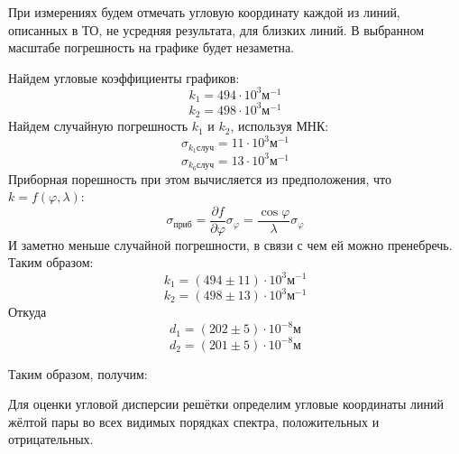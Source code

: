 \documentclass[14pt]{article}
\begin{document}
\begin{flushleft}
\end{flushleft}

При измерениях будем отмечать угловую координату каждой из линий, описанных в ТО, не усредняя результата, для близких линий. В выбранном масштабе погрешность на графике будет незаметна.

\vspace{1cm}
Найдем угловые коэффициенты графиков:
$$
	k_1 = 494\cdot10^3\text{м}^{-1}
$$
$$
	k_2 = 498\cdot10^3\text{м}^{-1}
$$
Найдем случайную погрешность $k_1$ и $k_2$, используя МНК:
$$
	\sigma_{k_1 \text{случ}} = 11\cdot10^3\text{м}^{-1}
$$
$$
	\sigma_{k_6 \text{случ}} = 13\cdot10^3\text{м}^{-1}
$$
Приборная порешность при этом вычисляется из предположения, что $k = f(\varphi, \lambda)$:
$$
	\sigma_\text{приб} = \frac{\partial f}{\partial \varphi}\sigma_\varphi = \frac{\cos\varphi}{\lambda}\sigma_\varphi
$$
И заметно меньше случайной погрешности, в связи с чем ей можно пренебречь. Таким образом:
$$
	k_1 = (494 \pm 11)\cdot10^3\text{м}^{-1}
$$
$$
	k_2 = (498 \pm 13)\cdot10^3\text{м}^{-1}
$$
Откуда
$$
	d_1 = (202 \pm 5)\cdot10^{-8}\text{м}
$$
$$
	d_2 = (201 \pm 5)\cdot10^{-8}\text{м}
$$

\vspace{1cm}
Таким образом, получим:

\begin{center}
\end{center}


Для оценки угловой дисперсии решётки определим угловые координаты линий жёлтой пары во всех видимых порядках спектра, положительных и отрицательных.
\end{document}
